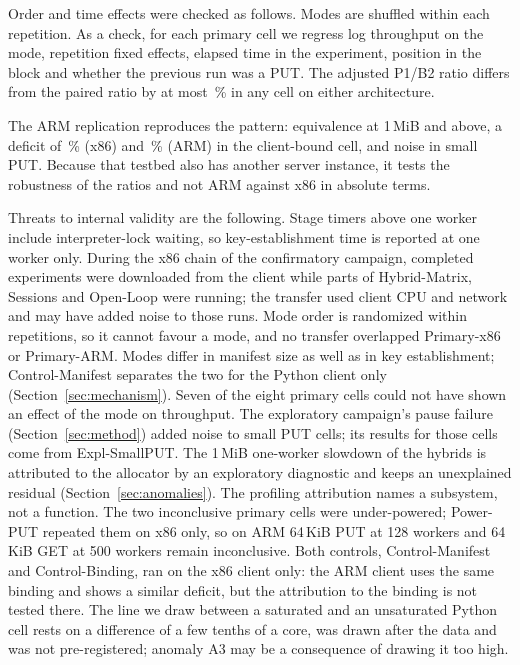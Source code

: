 \documentclass[conference]{IEEEtran}
\newcommand{\lab}[1]{\textsf{#1}}
\begin{document}
Order and time effects were checked as follows. Modes are shuffled within each repetition. As a check, for each primary cell we regress log
throughput on the mode, repetition fixed effects, elapsed time in the experiment, position in the
block and whether the previous run was a PUT. The adjusted P1/B2 ratio differs from the paired
ratio by at most \RevOrderShiftMax\,\% in any cell on either architecture.

The ARM replication reproduces the pattern: equivalence at 1\,MiB and above, a deficit of
\RevHotDeficit\,\% (x86) and \ArmHotDeficit\,\% (ARM) in the client-bound cell, and noise in small PUT. Because that testbed also has another server
instance, it tests the robustness of the ratios and not ARM against x86 in absolute terms.

Threats to internal validity are the following. Stage timers above one worker include interpreter-lock waiting, so
key-establishment time is reported at one worker only. During the x86 chain of the confirmatory
campaign, completed experiments were downloaded from the client while parts of
\lab{Hybrid-Matrix}, \lab{Sessions} and \lab{Open-Loop} were running; the transfer used client CPU and network and may have added noise to those runs.
Mode order is randomized within repetitions, so it cannot favour a mode, and no transfer
overlapped \lab{Primary-x86} or \lab{Primary-ARM}. Modes differ in manifest size as well as
in key establishment; \lab{Control-Manifest} separates the two for the Python client only
(Section~\ref{sec:mechanism}). Seven of the eight primary cells could not have shown an effect
of the mode on throughput. The exploratory campaign's pause failure
(Section~\ref{sec:method}) added noise to small PUT cells; its results for those cells come from
\lab{Expl-SmallPUT}. The 1\,MiB one-worker slowdown of the hybrids is attributed to the allocator by an exploratory
diagnostic and keeps an unexplained residual (Section~\ref{sec:anomalies}). The profiling
attribution names a subsystem, not a function. The two inconclusive primary cells were
under-powered; \lab{Power-PUT} repeated them on x86 only, so on ARM 64\,KiB PUT at 128 workers
and 64\,KiB GET at 500 workers remain inconclusive. Both controls,
\lab{Control-Manifest} and \lab{Control-Binding}, ran on the x86 client only: the ARM client
uses the same binding and shows a similar deficit, but the attribution to the binding is not
tested there. The line we draw between a saturated and an unsaturated Python cell rests on a
difference of a few tenths of a core, was drawn after the data and was not pre-registered;
anomaly A3 may be a consequence of drawing it too high.
\end{document}
